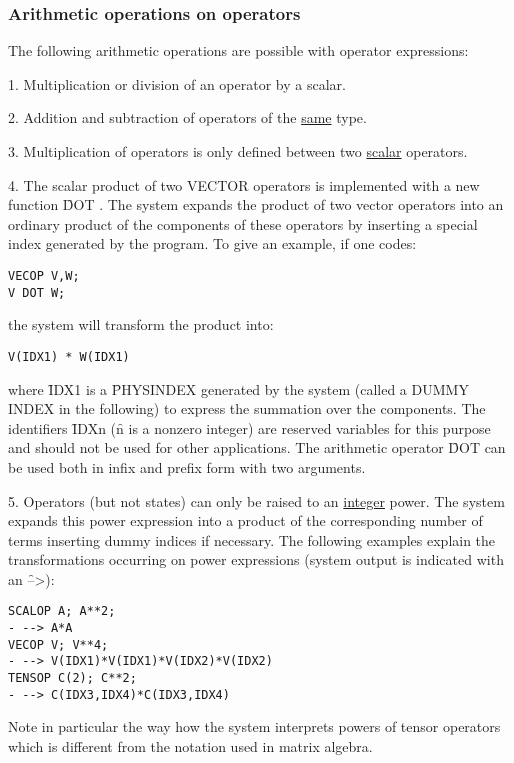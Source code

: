 \subsubsection{Arithmetic operations on operators}

The following arithmetic operations are possible with
operator expressions: 

1. Multiplication or division of an operator by a scalar.

2. Addition and subtraction of operators of the \underline{same} type.

3. Multiplication of operators is only defined between two
\underline{scalar} operators.

4. The scalar product of two VECTOR operators is implemented with
a new function \f{DOT} . The system expands the product of
two vector operators into an ordinary product of the components of these
operators by inserting a special index generated by the program.
To give an example, if one codes: 

\begin{verbatim}
VECOP V,W;
V DOT W;
\end{verbatim}
the system will transform the product into: 

\begin{verbatim}
V(IDX1) * W(IDX1)
\end{verbatim}
where \f{IDX1} is a \f{PHYSINDEX} generated by the system (called a DUMMY
INDEX in the following) to express the summation over the components.
The identifiers \f{IDXn} (\f{n} is
a nonzero integer) are
reserved variables for this purpose and should not be used for other
applications. The arithmetic operator
\f{DOT} can be used both in infix and prefix form with two arguments.

5. Operators (but not states) can only be raised to an
\underline{integer} power. The system expands this power
expression into a product of the corresponding number of terms
inserting dummy indices if necessary. The following examples explain
the transformations occurring on power expressions (system output
is indicated with an \f{-->}): 

\begin{verbatim}
SCALOP A; A**2;
- --> A*A
VECOP V; V**4;
- --> V(IDX1)*V(IDX1)*V(IDX2)*V(IDX2)
TENSOP C(2); C**2;
- --> C(IDX3,IDX4)*C(IDX3,IDX4)
\end{verbatim}
Note in particular the way how the system interprets powers of
tensor operators which is different from the notation used in matrix
algebra.

